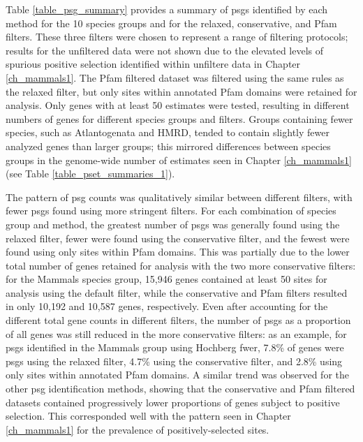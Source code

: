 Table \ref{table_psg_summary} provides a summary of \acp{psg}
identified by each method for the 10 species groups and for the
relaxed, conservative, and Pfam \sw filters. These three filters were
chosen to represent a range of filtering protocols; results for the
unfiltered \sw data were not shown due to the elevated levels of
spurious positive selection identified within unfiltere data in
Chapter \ref{ch_mammals1}. The Pfam filtered dataset was filtered
using the same rules as the relaxed filter, but only sites within
annotated Pfam domains were retained for analysis. Only genes with at
least 50 \sw estimates were tested, resulting in different numbers of
genes for different species groups and \sw filters. Groups containing
fewer species, such as Atlantogenata and HMRD, tended to contain
slightly fewer analyzed genes than larger groups; this mirrored
differences between species groups in the genome-wide number of \sw
estimates seen in Chapter \ref{ch_mammals1} (see Table
\ref{table_pset_summaries_1}).

The pattern of \ac{psg} counts was qualitatively similar between
different \sw filters, with fewer \acp{psg} found using more stringent
filters. For each combination of species group and method, the
greatest number of \acp{psg} was generally found using the relaxed
filter, fewer were found using the conservative filter, and the fewest
were found using only sites within Pfam domains. This was partially
due to the lower total number of genes retained for analysis with the
two more conservative filters: for the Mammals species group, 15,946
genes contained at least 50 sites for analysis using the default
filter, while the conservative and Pfam filters resulted in only
10,192 and 10,587 genes, respectively. Even after accounting for the
different total gene counts in different filters, the number of
\acp{psg} as a proportion of all genes was still reduced in the more
conservative filters: as an example, for \acp{psg} identified in the
Mammals group using Hochberg \ac{fwer}, 7.8\% of genes were \acp{psg}
using the relaxed filter, 4.7\% using the conservative filter, and
2.8\% using only sites within annotated Pfam domains. A similar trend
was observed for the other \ac{psg} identification methods, showing
that the conservative and Pfam filtered datasets contained
progressively lower proportions of genes subject to positive
selection. This corresponded well with the pattern seen in Chapter
\ref{ch_mammals1} for the prevalence of positively-selected sites.

